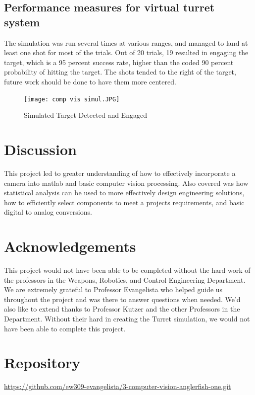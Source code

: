 \documentclass{article}
\begin{document}
\subsection{Performance measures for virtual turret system}
The simulation was run several times at various ranges, and managed to land at least one shot for most of the trials. Out of 20 trials, 19 resulted in engaging the target, which is a 95 percent success rate, higher than the coded 90 percent probability of hitting the target. The shots tended to the right of the target, future work should be done to have them more centered.
\begin{figure}
\texttt{[image: comp vis simul.JPG]}
 \caption{Simulated Target Detected and Engaged}
 \end{figure}
 
\section{Discussion}
This project led to greater understanding of how to effectively incorporate a camera into matlab and basic computer vision processing. Also covered was how statistical analysis can be used to more effectively design engineering solutions, how to efficiently select components to meet a projects requirements, and basic digital to analog conversions.

\section{Acknowledgements}
This project would not have been able to be completed without the hard work of the professors in the Weapons, Robotics, and Control Engineering Department.  We are extremely grateful to Professor Evangelista who helped guide us throughout the project and was there to answer questions when needed. We'd also like to extend thanks to Professor Kutzer and the other Professors in the Department. Without their hard in creating the Turret simulation, we would not have been able to complete this project.



\appendix

\section{Repository}
\url{https://github.com/ew309-evangelista/3-computer-vision-anglerfish-one.git}
\end{document}

